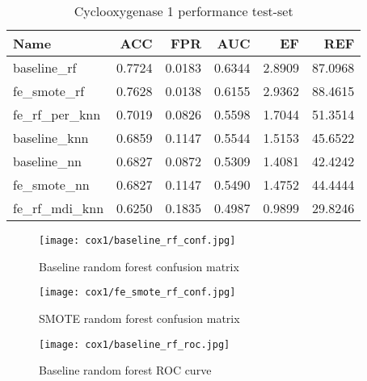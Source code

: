 \begin{table}[H]
    \begin{center}
        \caption{Cyclooxygenase 1 performance test-set}
        \begin{tabular}{lrrrrr}
            \toprule
            Name             & ACC    & FPR    & AUC    & EF     & REF     \\
            \midrule
            baseline\_rf     & 0.7724 & 0.0183 & 0.6344 & 2.8909 & 87.0968 \\
            fe\_smote\_rf    & 0.7628 & 0.0138 & 0.6155 & 2.9362 & 88.4615 \\
            fe\_rf\_per\_knn & 0.7019 & 0.0826 & 0.5598 & 1.7044 & 51.3514 \\
            baseline\_knn    & 0.6859 & 0.1147 & 0.5544 & 1.5153 & 45.6522 \\
            baseline\_nn     & 0.6827 & 0.0872 & 0.5309 & 1.4081 & 42.4242 \\
            fe\_smote\_nn    & 0.6827 & 0.1147 & 0.5490 & 1.4752 & 44.4444 \\
            fe\_rf\_mdi\_knn & 0.6250 & 0.1835 & 0.4987 & 0.9899 & 29.8246 \\
            \bottomrule
        \end{tabular}
    \end{center}
\end{table}

\begin{figure}[H]
    \begin{center}
        \caption[]{Baseline random forest confusion matrix}
        \label{fig:cox1_baseline_rf_conf}
        \texttt{[image: cox1/baseline\_rf\_conf.jpg]}
    \end{center}
\end{figure}

\begin{figure}[H]
    \begin{center}
        \caption[]{SMOTE random forest confusion matrix}
        \label{fig:cox1_smote_rf_conf}
        \texttt{[image: cox1/fe\_smote\_rf\_conf.jpg]}
    \end{center}

\end{figure}

\begin{figure}[H]
    \begin{center}
        \caption[]{Baseline random forest ROC curve}
        \label{fig:cox1_baseline_rf_roc}
        \texttt{[image: cox1/baseline\_rf\_roc.jpg]}
    \end{center}

\end{figure}

